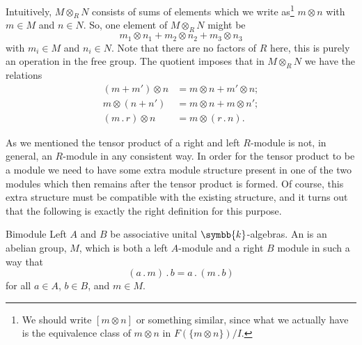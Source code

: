 \documentclass[fleqn]{NotesClass}
\renewcommand{\field}{\symbb{k}}
\newcommand{\action}{\mathbin{.}}
\begin{document}
    Intuitively, \(M \otimes_R N\) consists of sums of elements which we write as\footnote{We should write \([m \otimes n]\) or something similar, since what we actually have is the equivalence class of \(m \otimes n\) in \(F(\{m \otimes n\})/I\).} \(m \otimes n\) with \(m \in M\) and \(n \in N\).
    So, one element of \(M \otimes_R N\) might be
    \begin{equation}
        m_1 \otimes n_1 + m_2 \otimes n_2 + m_3 \otimes n_3
    \end{equation}
    with \(m_i \in M\) and \(n_i \in N\).
    Note that there are no factors of \(R\) here, this is purely an operation in the free group.
    The quotient imposes that in \(M \otimes_R N\) we have the relations
    \begin{align}
        (m + m') \otimes n &= m \otimes n + m' \otimes n;\\
        m \otimes (n + n') &= m \otimes n + m \otimes n';\\
        (m \action r) \otimes n &= m \otimes (r \action n).
    \end{align}
    
    As we mentioned the tensor product of a right and left \(R\)-module is not, in general, an \(R\)-module in any consistent way.
    In order for the tensor product to be a module we need to have some extra module structure present in one of the two modules which then remains after the tensor product is formed.
    Of course, this extra structure must be compatible with the existing structure, and it turns out that the following is exactly the right definition for this purpose.
    
    \begin{dfn}{Bimodule}{}
        Left \(A\) and \(B\) be associative unital \(\field\)-algebras.
        An  is an abelian group, \(M\), which is both a left \(A\)-module and a right \(B\) module in such a way that
        \begin{equation}
            (a \action m) \action b = a \action (m \action b)
        \end{equation}
        for all \(a \in A\), \(b \in B\), and \(m \in M\).
    \end{dfn}
    
\end{document}
